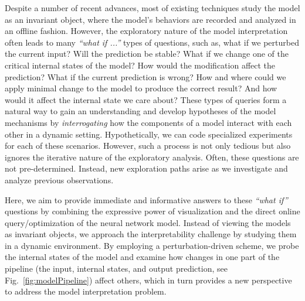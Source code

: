 Despite a number of recent advances, most of existing techniques study the model as an invariant object, where the model's behaviors are recorded and analyzed in an offline fashion.
%
However, the exploratory nature of the model interpretation often leads to many \emph{``what if ...''} types of questions,
such as, what if we perturbed the current input?
Will the prediction be stable?
What if we change one of the critical internal states of the model?
How would the modification affect the prediction?
What if the current prediction is wrong?
How and where could we apply minimal change to the model to produce the correct result? And how would it affect the internal state we care about? These types of queries form a natural way to gain an understanding and develop hypotheses of the model mechanisms by \emph{interrogating} how the components of a model interact with each other in a dynamic setting.
Hypothetically, we can code specialized experiments for each of these scenarios.
However, such a process is not only tedious but also ignores the iterative nature of the exploratory analysis. Often, these questions are not pre-determined.
Instead, new exploration paths arise as we investigate and analyze previous observations.

Here, we aim to provide immediate and informative answers to these \emph{``what if''} questions by combining the expressive power of visualization and the direct online query/optimization of the neural network model. Instead of viewing the models as invariant objects, we approach the interpretability challenge by studying them in a dynamic environment. By employing a perturbation-driven scheme, we probe the internal states of the model and examine how changes in one part of the pipeline (the input, internal states, and output prediction, see Fig.~\ref{fig:modelPipeline}) affect others, which in turn provides a new perspective to address the model interpretation problem.

